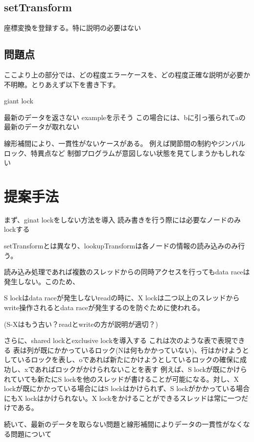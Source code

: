 \documentclass[a4paper]{jreport}	%
\begin{document}
\section{setTransform}

座標変換を登録する。特に説明の必要はない


\section{問題点}

ここより上の部分では、どの程度エラーケースを、どの程度正確な説明が必要か不明瞭。とりあえず以下を書き下す。

giant lock

最新のデータを返さない
exampleを示そう
%
この場合には、bに引っ張られてaの最新のデータが取れない

線形補間により、一貫性がないケースがある。
例えば関節間の制約やジンバルロック、特異点など
制御プログラムが意図しない状態を見てしまうかもしれない

\chapter{提案手法}

まず、ginat lockをしない方法を導入
読み書きを行う際には必要なノードのみlockする

setTransformとは異なり、lookupTransformは各ノードの情報の読み込みのみ行う。

読み込み処理であれば複数のスレッドからの同時アクセスを行ってもdata raceは発生しない。このため、


S lockはdata raceが発生しないreadの時に、X lockは二つ以上のスレッドからwrite操作されるとdata raceが発生するのを防ぐために使われる。

(S-Xはもう古い？readとwriteの方が説明が適切？)


さらに、shared lockとexclusive lockを導入する
これは次のような表で表現できる
%
表は列が既にかかっているロック(Nは何もかかっていない)、行はかけようとしているロックを表し、oであれば新たにかけようとしているロックの確保に成功し、xであればロックがかけられないことを表す
例えば、S lockが既にかけられていても新たにS lockを他のスレッドが書けることが可能になる。対し、X lockが既にかかっている場合にはS lockはかけられず、S lockがかかっている場合にもX lockはかけられない。X lockをかけることができるスレッドは常に一つだけである。


続いて、最新のデータを取らない問題と線形補間によりデータの一貫性がなくなる問題について
\end{document}
